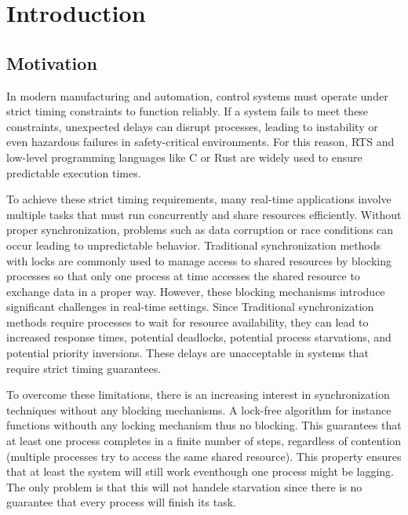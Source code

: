 \chapter{Introduction}\label{ch:introduction}

\section{Motivation}\label{sec:motivation}

In modern manufacturing and automation, control systems must operate under strict timing constraints to function reliably. If a system fails to meet these constraints, unexpected delays can disrupt processes, leading to instability or even hazardous failures in safety-critical environments. For this reason, \ac{RTS} and low-level programming languages like C or Rust are widely used to ensure predictable execution times.

To achieve these strict timing requirements, many real-time applications involve multiple tasks that must run concurrently and share resources efficiently. Without proper synchronization, problems such as data corruption or race conditions can occur leading to unpredictable behavior. Traditional synchronization methods with locks are commonly used to manage access to shared resources by blocking processes so that only one process at time accesses the shared resource to exchange data in a proper way. However, these blocking mechanisms introduce significant challenges in real-time settings. Since Traditional synchronization methods require processes to wait for resource availability, they can lead to increased response times, potential deadlocks, potential process starvations, and potential priority inversions. These delays are unacceptable in systems that require strict timing guarantees. \cite{herlihy1991wait, brandenburg2019multiprocessorrealtimelockingprotocols, kode2024analysisSynchronization}

To overcome these limitations, there is an increasing interest in synchronization techniques without any blocking mechanisms. A lock-free algorithm for instance functions withouth any locking mechanism thus no blocking. This guarantees that at least one process completes in a finite number of steps, regardless of contention (multiple processes try to access the same shared resource). This property ensures that at least the system will still work eventhough one process might be lagging. The only problem is that this will not handele starvation since there is no guarantee that every process will finish its task. \cite{kogan2012methodology}

